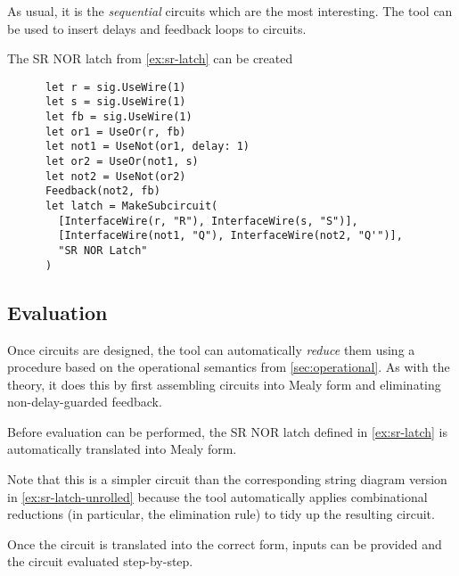 As usual, it is the \emph{sequential} circuits which are the most interesting.
The tool can be used to insert delays and feedback loops to circuits.

\begin{example}\label{ex:sr-latch-hdl}
  The SR NOR latch from \cref{ex:sr-latch} can be created
  \begin{lstlisting}
      let r = sig.UseWire(1)
      let s = sig.UseWire(1)
      let fb = sig.UseWire(1)
      let or1 = UseOr(r, fb)
      let not1 = UseNot(or1, delay: 1)
      let or2 = UseOr(not1, s)
      let not2 = UseNot(or2)
      Feedback(not2, fb)
      let latch = MakeSubcircuit(
        [InterfaceWire(r, "R"), InterfaceWire(s, "S")],
        [InterfaceWire(not1, "Q"), InterfaceWire(not2, "Q'")],
        "SR NOR Latch"
      )
    \end{lstlisting}
  \begin{center}
    \scalebox{0.3}{}
  \end{center}
\end{example}

\subsection{Evaluation}

Once circuits are designed, the tool can automatically \emph{reduce} them
using a procedure based on the operational semantics from
\cref{sec:operational}.
As with the theory, it does this by first assembling circuits into Mealy form
and eliminating non-delay-guarded feedback.

\begin{example}
  Before evaluation can be performed, the SR NOR latch defined in
  \cref{ex:sr-latch} is automatically translated into Mealy form.
  \begin{center}
    \scalebox{0.25}{}
  \end{center}
  Note that this is a simpler circuit than the corresponding string diagram
  version in \cref{ex:sr-latch-unrolled} because the tool automatically
  applies combinational reductions (in particular, the elimination rule) to
  tidy up the resulting circuit.
\end{example}

Once the circuit is translated into the correct form, inputs can be provided
and the circuit evaluated step-by-step.

